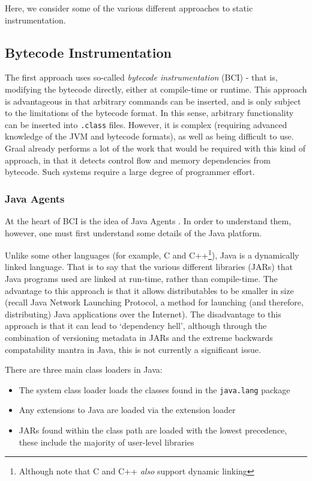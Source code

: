 Here, we consider some of the various different approaches to static instrumentation.

\subsection{Bytecode Instrumentation} \label{sec:instrumentation/bytecode-instr}
The first approach uses so-called \textit{bytecode instrumentation} (BCI) - that is, modifying the bytecode directly, either at compile-time or runtime. This approach is advantageous in that arbitrary commands can be inserted, and is only subject to the limitations of the bytecode format. In this sense, arbitrary functionality can be inserted into \texttt{.class} files. However, it is complex (requiring advanced knowledge of the JVM and bytecode formats), as well as being difficult to use. Graal already performs a lot of the work that would be required with this kind of approach, in that it detects control flow and memory dependencies from bytecode. Such systems require a large degree of programmer effort.

        \subsubsection{Java Agents} \label{sec:instrumentation/bytecode-instr/agents}
        At the heart of BCI is the idea of Java Agents \citep{javaagents}. In order to understand them, however, one must first understand some details of the Java platform.

        Unlike some other languages (for example, C and C++\footnote{Although note that C and C++ \emph{also} support dynamic linking}), Java is a dynamically linked language. That is to say that the various different libraries (JARs) that Java programs used are linked at run-time, rather than compile-time. The advantage to this approach is that it allows distributables to be smaller in size (recall Java Network Launching Protocol, a method for launching (and therefore, distributing) Java applications over the Internet). The disadvantage to this approach is that it can lead to `dependency hell', although through the combination of versioning metadata in JARs and the extreme backwards compatability mantra in Java, this is not currently a significant issue.

                There are three main class loaders in Java:

                \begin{itemize}
                        \item The system class loader loads the classes found in the \texttt{java.lang} package
                        \item Any extensions to Java are loaded via the extension loader
                        \item JARs found within the class path are loaded with the lowest precedence, these include the majority of user-level libraries
                \end{itemize}

